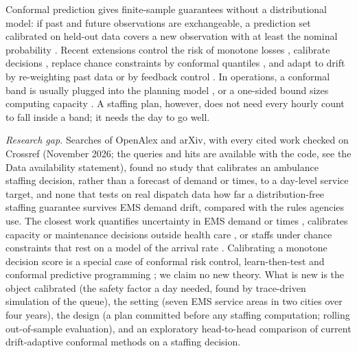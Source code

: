 \documentclass[12pt]{article}
\begin{document}
Conformal prediction gives finite-sample guarantees without a distributional model: if past and future observations are exchangeable, a prediction set calibrated on held-out data covers a new observation with at least the nominal probability \citep{vovk2022algorithmic,lei2018distribution,angelopoulos2023gentle}. Recent extensions control the risk of monotone losses \citep{angelopoulos2024conformal,angelopoulos2025learn}, calibrate decisions \citep{lekeufack2024conformal,alallawi2026decision}, replace chance constraints by conformal quantiles \citep{zhao2024conformal}, and adapt to drift by re-weighting past data \citep{barber2023beyond,tibshirani2019conformal} or by feedback control \citep{gibbs2021adaptive,angelopoulos2023pid}. In operations, a conformal band is usually plugged into the planning model \citep{makhado2026conformal}, or a one-sided bound sizes computing capacity \citep{ke2026rightsizing}. A staffing plan, however, does not need every hourly count to fall inside a band; it needs the day to go well.

\emph{Research gap.} Searches of OpenAlex and arXiv, with every cited work checked on Crossref (November 2026; the queries and hits are available with the code, see the Data availability statement), found no study that calibrates an ambulance staffing decision, rather than a forecast of demand or times, to a day-level service target, and none that tests on real dispatch data how far a distribution-free staffing guarantee survives EMS demand drift, compared with the rules agencies use. The closest work quantifies uncertainty in EMS demand or times \citep{monks2023forecasting,rostamitabar2024hierarchical,kara2026beyond,mappouras2026process}, calibrates capacity or maintenance decisions outside health care \citep{ke2026rightsizing,alallawi2026decision}, or staffs under chance constraints that rest on a model of the arrival rate \citep{gurvich2010staffing}. Calibrating a monotone decision score is a special case of conformal risk control, learn-then-test and conformal predictive programming \citep{angelopoulos2024conformal,angelopoulos2025learn,zhao2024conformal}; we claim no new theory. What is new is the object calibrated (the safety factor a day needed, found by trace-driven simulation of the queue), the setting (seven EMS service areas in two cities over four years), the design (a plan committed before any staffing computation; rolling out-of-sample evaluation), and an exploratory head-to-head comparison of current drift-adaptive conformal methods on a staffing decision.
\end{document}
